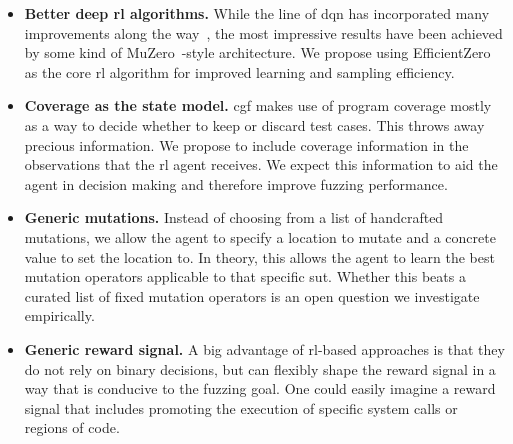 \begin{itemize}
  \item \textbf{Better deep \gls{rl} algorithms.}
    While the line of \gls{dqn} has incorporated many improvements along the
    way~\cite{hessel_rainbow_2017}, the most impressive results have been
    achieved by some kind of MuZero~\cite{schrittwieser_mastering_2020}-style
    architecture. We propose using EfficientZero~\cite{ye_mastering_2021}
    as the core \gls{rl} algorithm for improved learning and sampling efficiency.

  \item \textbf{Coverage as the state model.}
    \Gls{cgf} makes use of program coverage mostly as a way to decide whether to keep
    or discard test cases.
    This throws away precious information.
    We propose to include coverage information in the observations that the \gls{rl} agent receives.
    We expect this information to aid the agent in decision making and therefore improve fuzzing performance.

  \item \textbf{Generic mutations.}
    Instead of choosing from a list of handcrafted mutations, we allow the agent
    to specify a location to mutate and a concrete value to set the location to.
    In theory, this allows the agent to learn the best mutation operators applicable
    to that specific \gls{sut}.
    Whether this beats a curated list of fixed mutation operators is an open question
    we investigate empirically.

  \item \textbf{Generic reward signal.}
    A big advantage of \gls{rl}-based approaches is that they do not rely on binary decisions,
    but can flexibly shape the reward signal in a way that is conducive to the fuzzing goal.
    One could easily imagine a reward signal that includes promoting the execution of
    specific system calls or regions of code.
\end{itemize}
